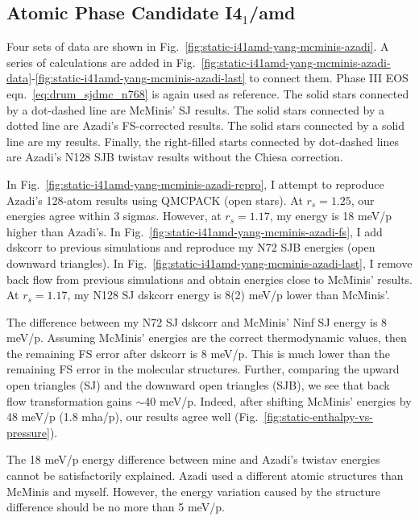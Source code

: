 \subsection{Atomic Phase Candidate I4$_1$/amd}

Four sets of data are shown in Fig.~\ref{fig:static-i41amd-yang-mcminis-azadi}. A series of calculations are added in Fig.~\ref{fig:static-i41amd-yang-mcminis-azadi-data}-\ref{fig:static-i41amd-yang-mcminis-azadi-last} to connect them. Phase III EOS eqn.~\ref{eq:drum_sjdmc_n768} is again used as reference. The solid stars connected by a dot-dashed line are McMinis' SJ results. The solid stars connected by a dotted line are Azadi's FS-corrected results. The solid stars connected by a solid line are my results. Finally, the right-filled starts connected by dot-dashed lines are Azadi's N128 SJB twistav results without the Chiesa correction.

In Fig.~\ref{fig:static-i41amd-yang-mcminis-azadi-repro}, I attempt to reproduce Azadi's 128-atom results using QMCPACK (open stars). At $r_s=1.25$, our energies agree within 3 sigmas. However, at $r_s=1.17$, my energy is 18 meV/p higher than Azadi's. In Fig.~\ref{fig:static-i41amd-yang-mcminis-azadi-fs}, I add dskcorr to previous simulations and reproduce my N72 SJB energies (open downward triangles). In Fig.~\ref{fig:static-i41amd-yang-mcminis-azadi-last}, I remove back flow from previous simulations and obtain energies close to McMinis' results. At $r_s=1.17$, my N128 SJ dskcorr energy is 8(2) meV/p lower than McMinis'.

The difference between my N72 SJ dskcorr and McMinis' Ninf SJ energy is 8 meV/p. Assuming McMinis' energies are the correct thermodynamic values, then the remaining FS error after dskcorr is 8 meV/p. This is much lower than the remaining FS error in the molecular structures. Further, comparing the upward open triangles (SJ) and the downward open triangles (SJB), we see that back flow transformation gains $\sim$40 meV/p. Indeed, after shifting McMinis' energies by 48 meV/p (1.8 mha/p), our results agree well (Fig.~\ref{fig:static-enthalpy-vs-pressure}).

The 18 meV/p energy difference between mine and Azadi's twistav energies cannot be satisfactorily explained. Azadi used a different atomic structures than McMinis and myself. However, the energy variation caused by the structure difference should be no more than 5 meV/p.

